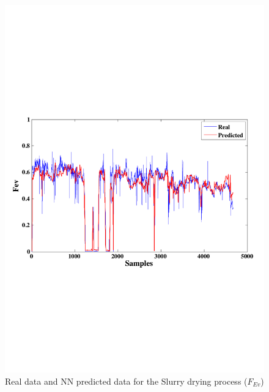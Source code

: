 \begin{figure}
\centering
\includegraphics[width=1\textwidth]{ANN-Evaporator.pdf}
\caption{Real data and NN predicted data for the Slurry drying process ($F_{Ev}$) }
\label{Pturbine}
\end{figure}
